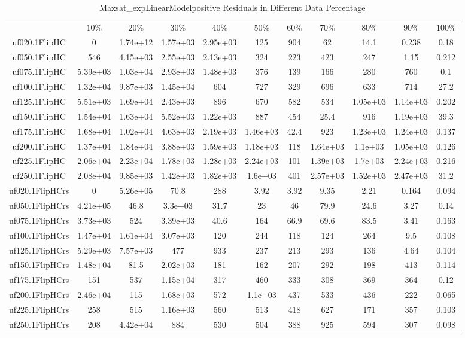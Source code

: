\begin{table}[htbp]
\caption{Maxsat_expLinearModelpositive Residuals in Different Data Percentage}
\centering
\begin{tabular}{|ccccccccccc|}
\hline
 & $10\%$ & $20\%$ & $30\%$ & $40\%$ & $50\%$ & $60\%$ & $70\%$ & $80\%$ & $90\%$ & $100\%$ \\
uf020.1FlipHC &    0 & 1.74e+12 & 1.57e+03 & 2.95e+03 &  125 &  904 &   62 & 14.1 & 0.238 & 0.18 \\
uf050.1FlipHC &  546 & 4.15e+03 & 2.55e+03 & 2.13e+03 &  324 &  223 &  423 &  247 & 1.15 & 0.212 \\
uf075.1FlipHC & 5.39e+03 & 1.03e+04 & 2.93e+03 & 1.48e+03 &  376 &  139 &  166 &  280 &  760 &  0.1 \\
uf100.1FlipHC & 1.32e+04 & 9.87e+03 & 1.45e+04 &  604 &  727 &  329 &  696 &  633 &  714 & 27.2 \\
uf125.1FlipHC & 5.51e+03 & 1.69e+04 & 2.43e+03 &  896 &  670 &  582 &  534 & 1.05e+03 & 1.14e+03 & 0.202 \\
uf150.1FlipHC & 1.54e+04 & 1.63e+04 & 5.52e+03 & 1.22e+03 &  887 &  454 & 25.4 &  916 & 1.19e+03 & 39.3 \\
uf175.1FlipHC & 1.68e+04 & 1.02e+04 & 4.63e+03 & 2.19e+03 & 1.46e+03 & 42.4 &  923 & 1.23e+03 & 1.24e+03 & 0.137 \\
uf200.1FlipHC & 1.37e+04 & 1.84e+04 & 3.88e+03 & 1.59e+03 & 1.18e+03 &  118 & 1.64e+03 & 1.1e+03 & 1.05e+03 & 0.126 \\
uf225.1FlipHC & 2.06e+04 & 2.23e+04 & 1.78e+03 & 1.28e+03 & 2.24e+03 &  101 & 1.39e+03 & 1.7e+03 & 2.24e+03 & 0.216 \\
uf250.1FlipHC & 2.08e+04 & 9.85e+03 & 1.42e+03 & 1.82e+03 & 1.6e+03 &  401 & 2.57e+03 & 1.52e+03 & 2.47e+03 & 31.2 \\
uf020.1FlipHCrs &    0 & 5.26e+05 & 70.8 &  288 & 3.92 & 3.92 & 9.35 & 2.21 & 0.164 & 0.094 \\
uf050.1FlipHCrs & 4.21e+05 & 46.8 & 3.3e+03 & 31.7 &   23 &   46 & 79.9 & 24.6 & 3.27 & 0.14 \\
uf075.1FlipHCrs & 3.73e+03 &  524 & 3.39e+03 & 40.6 &  164 & 66.9 & 69.6 & 83.5 & 3.41 & 0.163 \\
uf100.1FlipHCrs & 1.47e+04 & 1.61e+04 & 3.07e+03 &  120 &  244 &  118 &  124 &  264 &  9.5 & 0.108 \\
uf125.1FlipHCrs & 5.29e+03 & 7.57e+03 &  477 &  933 &  237 &  213 &  293 &  136 & 4.64 & 0.104 \\
uf150.1FlipHCrs & 1.48e+04 & 81.5 & 2.02e+03 &  181 &  162 &  207 &  292 &  198 &  413 & 0.114 \\
uf175.1FlipHCrs &  151 &  537 & 1.15e+04 &  317 &  460 &  333 &  308 &  369 &  364 & 0.12 \\
uf200.1FlipHCrs & 2.46e+04 &  115 & 1.68e+03 &  572 & 1.1e+03 &  437 &  533 &  436 &  222 & 0.065 \\
uf225.1FlipHCrs &  258 &  515 & 1.16e+03 &  560 &  513 &  418 &  627 &  171 &  357 & 0.103 \\
uf250.1FlipHCrs &  208 & 4.42e+04 &  884 &  530 &  504 &  388 &  925 &  594 &  307 & 0.098 \\
\hline
\end{tabular}
\end{table}
